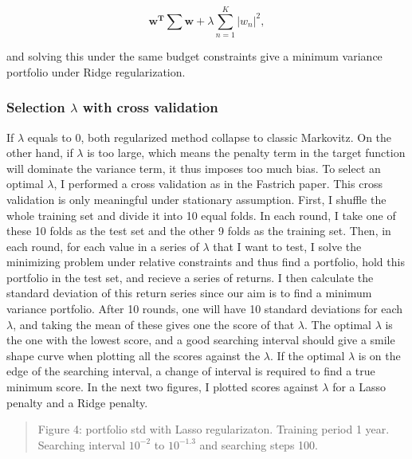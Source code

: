 \documentclass{article}
\newcommand{\ciapdf}[1]{\vspace*{-\parskip}\begin{center}\resizebox{0.75\textwidth}{!}{\texttt{[image: \#1]}}\end{center}}
\begin{document}
\begin{equation*}
\mathbf{w^T\sum w} + \lambda \sum_{n= 1}^{K}\left | w_n \right |^2,
\end{equation*}

and solving this under the same budget constraints give a minimum variance
portfolio under Ridge regularization.

\subsubsection*{Selection $\lambda$ with cross validation}

If $\lambda$ equals to 0, both regularized method collapse to classic Markovitz.
On the other hand, if $\lambda$ is too large, which means the penalty term in
the target function will dominate the variance term, it thus imposes too much bias.
To select an optimal $\lambda$, I performed a cross validation as in the Fastrich
paper. This cross validation is only meaningful under stationary assumption.
First, I shuffle the whole training set and divide it into 10 equal folds.
In each round, I take one of these 10 folds as the test set and the other 9 folds as
the training set. Then, in each round, for each value in a series of $\lambda$
that I want to test,
I solve the minimizing problem under relative constraints and thus find a
portfolio, hold this portfolio in the test set, and recieve a series of
returns. I then calculate the
standard deviation of this return series since our aim is to find a minimum
variance portfolio. After 10 rounds, one will have 10 standard deviations for each
$\lambda$, and taking the mean of these gives one the score of that $\lambda$. The
optimal $\lambda$ is the one with the lowest score, and a good searching
interval should give a smile shape curve when plotting all the scores against
the $\lambda$.
If the optimal $\lambda$ is on the edge of the searching interval, a change of interval
is required to find a true minimum score. In the next two figures, I plotted
scores against $\lambda$ for a Lasso penalty and a Ridge penalty.



\ciapdf{Figure_4T2.pdf}

\begin{quote}
Figure 4: portfolio std with Lasso regularizaton. Training period 1 year. Searching
interval $10^{-2}$ to $10^{-1.3}$ and searching steps 100.
\end{quote}


\ciapdf{Figure_5T2.pdf}
\end{document}
